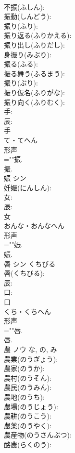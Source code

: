 \documentclass[8pt]{extreport}
\begin{document}
\begin{CJK}{UTF8}{min}
\\	不振(ふしん): 
\\	振動(しんどう): 
\\	振り(ふり): 
\\	振り返る(ふりかえる): 
\\	振り出し(ふりだし): 
\\	身振り(みぶり): 
\\	振る(ふる): 
\\	振る舞う(ふるまう): 
\\	振り(ぶり): 
\\	振り仮名(ふりがな): 
\\	振り向く(ふりむく): 
\\	手: 
\\	辰: 
\\	手	
\\	て・てへん	
\\	形声 
\\	=""振.
\\	振.
\\	娠	シン			
\\	妊娠(にんしん): 
\\	女: 
\\	辰: 
\\	女	
\\	おんな・おんなへん	
\\	形声 
\\	=""娠.
\\	娠.
\\	唇	シン	くちびる		
\\	唇(くちびる): 
\\	辰: 
\\	口: 
\\	口	
\\	くち・くちへん	
\\	形声 
\\	=""唇.
\\	唇.
\\	農	ノウ		な, の, み	
\\	農業(のうぎょう): 
\\	農家(のうか): 
\\	農村(のうそん): 
\\	農民(のうみん): 
\\	農地(のうち): 
\\	農場(のうじょう): 
\\	農耕(のうこう): 
\\	農薬(のうやく): 
\\	農産物(のうさんぶつ): 
\\	酪農(らくのう): 

\end{CJK}
\end{document}

